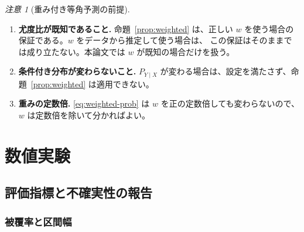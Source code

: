 \documentclass[a4paper,11pt]{jsarticle}
\theoremstyle{definition}
\theoremstyle{plain}
\theoremstyle{remark}
\newtheorem{remark}[definition]{注意}
\begin{document}
\begin{remark}[重み付き等角予測の前提]
  \label{rem:weighted-assumptions}
  \leavevmode
  \begin{enumerate}
    \item \textbf{尤度比が既知であること.}
      命題~\ref{prop:weighted} は、正しい $w$ を使う場合の保証である。$w$ をデータから推定して使う場合は、
      この保証はそのままでは成り立たない。本論文では $w$ が既知の場合だけを扱う。
    \item \textbf{条件付き分布が変わらないこと.}
      $P_{Y\mid X}$ が変わる場合は、設定を満たさず、命題~\ref{prop:weighted} は適用できない。
    \item \textbf{重みの定数倍.}
      \eqref{eq:weighted-prob} は $w$ を正の定数倍しても変わらないので、$w$ は定数倍を除いて分かればよい。
  \end{enumerate}
\end{remark}

\section{数値実験}
\label{sec:experiments}

\subsection{評価指標と不確実性の報告}
\label{sec:metrics}

\subsubsection{被覆率と区間幅}
\end{document}
